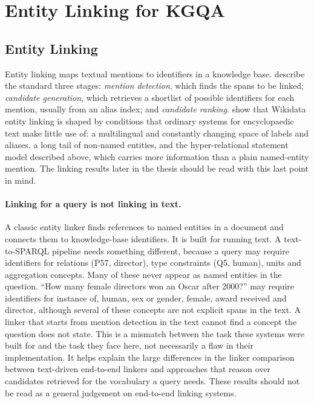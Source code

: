 \section{Entity Linking for KGQA}

\subsection{Entity Linking}

\label{sec:el-background}

Entity linking maps textual mentions to identifiers in a knowledge base.
\citet{shen2015entitylinking} describe the standard three stages: \emph{mention detection}, which finds the spans to be linked; \emph{candidate generation}, which retrieves a shortlist of possible identifiers for each mention, usually from an alias index; and \emph{candidate ranking}.
\citet{moller2022survey} show that Wikidata entity linking is shaped by conditions that ordinary systems for encyclopaedic text make little use of: a multilingual and constantly changing space of labels and aliases, a long tail of non-named entities, and the hyper-relational statement model described above, which carries more information than a plain named-entity mention.
The linking results later in the thesis should be read with this last point in mind.

\paragraph{Linking for a query is not linking in
text.}

A classic entity linker finds references to named entities in a document and connects them to knowledge-base identifiers.
It is built for running text.
A text-to-SPARQL pipeline needs something different, because a query may require identifiers for relations (P57, director), type constraints (Q5, human), units and aggregation concepts.
Many of these never appear as named entities in the question.
“How many female directors won an Oscar after 2000?” may require identifiers for instance of, human, sex or gender, female, award received and director, although several of these concepts are not explicit spans in the text.
A linker that starts from mention detection in the text cannot find a concept the question does not state.
This is a mismatch between the task these systems were built for and the task they face here, not necessarily a flaw in their implementation.
It helps explain the large differences in the linker comparison between text-driven end-to-end linkers and approaches that reason over candidates retrieved for the vocabulary a query needs.
These results should not be read as a general judgement on end-to-end linking systems.

